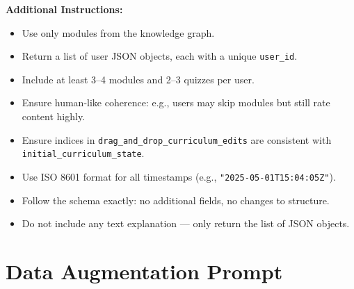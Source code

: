 \begin{tcolorbox}[colback=gray!5!white, colframe=black!60!black, title=Prompt: Synthetic Data Generation]
{\textbf{Additional Instructions:}
\begin{itemize}
  \item Use only modules from the knowledge graph.
  \item Return a list of user JSON objects, each with a unique \texttt{user\_id}.
  \item Include at least 3–4 modules and 2–3 quizzes per user.
  \item Ensure human-like coherence: e.g., users may skip modules but still rate content highly.
  \item Ensure indices in \texttt{drag\_and\_drop\_curriculum\_edits} are consistent with \texttt{initial\_curriculum\_state}.
  \item Use ISO 8601 format for all timestamps (e.g., \texttt{"2025-05-01T15:04:05Z"}).
  \item Follow the schema exactly: no additional fields, no changes to structure.
  \item Do not include any text explanation — only return the list of JSON objects.
\end{itemize}
}

\end{tcolorbox}

\section{Data Augmentation Prompt}
\label{appendix:prompt2}

